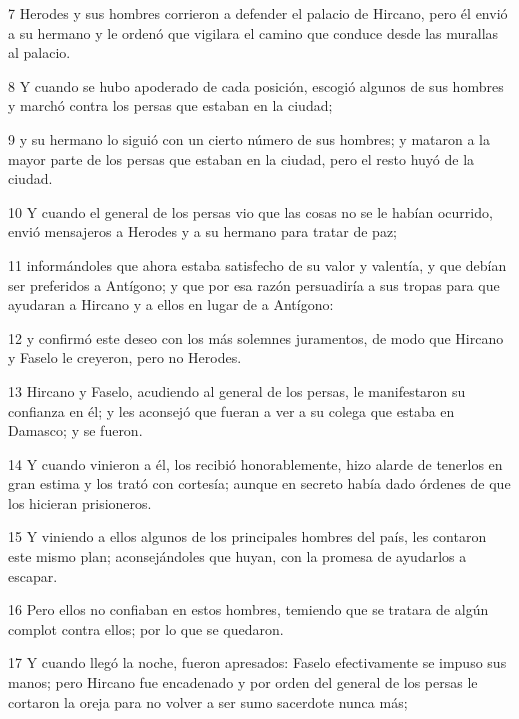 \par 7 Herodes y sus hombres corrieron a defender el palacio de Hircano, pero él envió a su hermano y le ordenó que vigilara el camino que conduce desde las murallas al palacio.

\par 8 Y cuando se hubo apoderado de cada posición, escogió algunos de sus hombres y marchó contra los persas que estaban en la ciudad;

\par 9 y su hermano lo siguió con un cierto número de sus hombres; y mataron a la mayor parte de los persas que estaban en la ciudad, pero el resto huyó de la ciudad.

\par 10 Y cuando el general de los persas vio que las cosas no se le habían ocurrido, envió mensajeros a Herodes y a su hermano para tratar de paz;

\par 11 informándoles que ahora estaba satisfecho de su valor y valentía, y que debían ser preferidos a Antígono; y que por esa razón persuadiría a sus tropas para que ayudaran a Hircano y a ellos en lugar de a Antígono:

\par 12 y confirmó este deseo con los más solemnes juramentos, de modo que Hircano y Faselo le creyeron, pero no Herodes.

\par 13 Hircano y Faselo, acudiendo al general de los persas, le manifestaron su confianza en él; y les aconsejó que fueran a ver a su colega que estaba en Damasco; y se fueron.

\par 14 Y cuando vinieron a él, los recibió honorablemente, hizo alarde de tenerlos en gran estima y los trató con cortesía; aunque en secreto había dado órdenes de que los hicieran prisioneros.

\par 15 Y viniendo a ellos algunos de los principales hombres del país, les contaron este mismo plan; aconsejándoles que huyan, con la promesa de ayudarlos a escapar.

\par 16 Pero ellos no confiaban en estos hombres, temiendo que se tratara de algún complot contra ellos; por lo que se quedaron.

\par 17 Y cuando llegó la noche, fueron apresados: Faselo efectivamente se impuso sus manos; pero Hircano fue encadenado y por orden del general de los persas le cortaron la oreja para no volver a ser sumo sacerdote nunca más;

